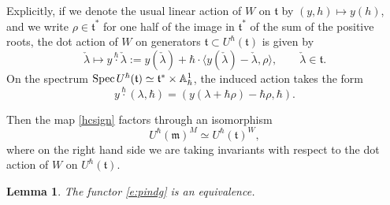 \documentclass{amsart}
\newtheorem{Lem}[Thm]{Lemma}
\theoremstyle{definition}
\newcommand{\fm}{\mathfrak{m}}
\newcommand{\fb}{\mathfrak{b}}
\newcommand{\Spec}{\on{Spec}\hspace{.5mm}}
\newcommand{\ft}{\mathfrak{t}}
\newcommand{\on}{\mathrm}
\newcommand{\End}{\operatorname{End}}
\numberwithin{equation}{section}
\begin{document}
{Explicitly, if we denote the usual linear action of $W$ on $\ft$ by $(y, h) \mapsto y(h)$, and we write $\rho \in \ft^*$ for one half of the image in $\ft^*$ of the sum of the positive roots, the dot action of $W$ on generators $\ft\subset U^\hbar(\ft)$  is given by 
$$\check{\lambda} \mapsto y \overset{\hbar}\cdot \check{\lambda} := y(\check{\lambda}) + \hbar \cdot \langle y(\check{\lambda}) - \check{\lambda}, \rho \rangle, \quad \quad \check{\lambda} \in \ft.$$
On the spectrum $\Spec U^\hbar(\ft) \simeq \ft^* \times \mathbb{A}^1_\hbar$, the induced action takes the form 
$$y \overset{\hbar} \cdot (\lambda, \hbar) = ( y(\lambda + \hbar \rho) - \hbar \rho, \hbar).$$

Then the map \eqref{hcsign} factors through an isomorphism 
$$U^\hbar(\fm)^M \simeq U^\hbar(\ft)^W,$$
where on the right hand side we are taking invariants with respect to the dot action
of $W$ on $U^\hbar(\ft)$. 

}






\iffalse 
\begin{Lem} The functor \eqref{e:pindg} is an equivalence. 
\end{Lem}
\end{document}
